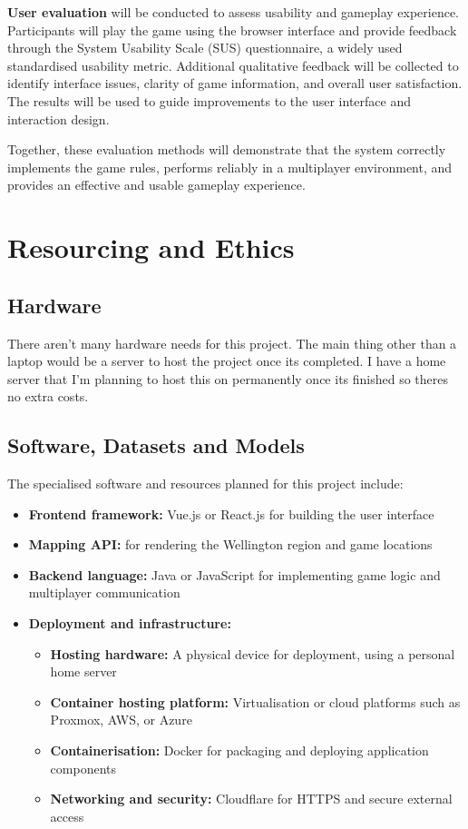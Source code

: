 \documentclass[11pt, a4paper, twoside, openright]{article}
\begin{document}
	\textbf{User evaluation} will be conducted to assess usability and gameplay experience. Participants will play the game using the browser interface and provide feedback through the System Usability Scale (SUS) questionnaire, a widely used standardised usability metric. Additional qualitative feedback will be collected to identify interface issues, clarity of game information, and overall user satisfaction. The results will be used to guide improvements to the user interface and interaction design.
	
	Together, these evaluation methods will demonstrate that the system correctly implements the game rules, performs reliably in a multiplayer environment, and provides an effective and usable gameplay experience.
	
	\section{Resourcing and Ethics}	
	\subsection{Hardware}
	
	There aren't many hardware needs for this project. The main thing other than a laptop would be a server to host the project once its completed. I have a home server that I'm planning to host this on permanently once its finished so theres no extra costs.
	
	\subsection{Software, Datasets and Models}
		
	The specialised software and resources planned for this project include:
	
	\begin{itemize}
		\item \textbf{Frontend framework:} Vue.js or React.js for building the user interface
		\item \textbf{Mapping API:} for rendering the Wellington region and game locations
		\item \textbf{Backend language:} Java or JavaScript for implementing game logic and multiplayer communication
		\item \textbf{Deployment and infrastructure:}
		\begin{itemize}
			\item \textbf{Hosting hardware:} A physical device for deployment, using a personal home server
			\item \textbf{Container hosting platform:} Virtualisation or cloud platforms such as Proxmox, AWS, or Azure
			\item \textbf{Containerisation:} Docker for packaging and deploying application components
			\item \textbf{Networking and security:} Cloudflare for HTTPS and secure external access
		\end{itemize}
	\end{itemize}
	
\end{document}
